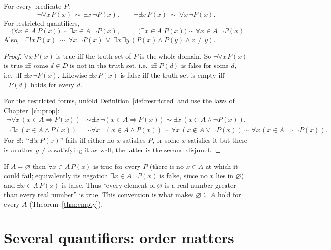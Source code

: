 \begin{theorem}\label{thm:qneg}
	For every predicate $P$:
	\[
	\neg\forall x\,P(x)\ \sim\ \exists x\,\neg P(x),\qquad \neg\exists x\,P(x)\ \sim\ \forall x\,\neg P(x).
	\]
	For restricted quantifiers,
	\[
	\neg\bigl(\forall x\in A\;P(x)\bigr)\sim\exists x\in A\;\neg P(x),\qquad
	\neg\bigl(\exists x\in A\;P(x)\bigr)\sim\forall x\in A\;\neg P(x).
	\]
	Also, $\neg\exists!x\,P(x)\ \sim\ \forall x\,\neg P(x)\ \vee\ \exists x\,\exists y\,(P(x)\wedge P(y)\wedge x\neq y)$.
\end{theorem}
\begin{proof}
	$\forall x\,P(x)$ is true iff the truth set of $P$ is the whole domain. So $\neg\forall x\,P(x)$ is true iff some $d\in D$ is not in the truth set, i.e.\ iff $P(d)$ is false for some $d$, i.e.\ iff $\exists x\,\neg P(x)$. Likewise $\exists x\,P(x)$ is false iff the truth set is empty iff $\neg P(d)$ holds for every $d$.
	
	For the restricted forms, unfold Definition~\ref{def:restricted} and use the laws of Chapter~\ref{ch:prop}:
	\begin{align*}
		\neg\forall x\,(x\in A\Rightarrow P(x))&\sim\exists x\,\neg(x\in A\Rightarrow P(x))\sim\exists x\,(x\in A\wedge\neg P(x)),\\
		\neg\exists x\,(x\in A\wedge P(x))&\sim\forall x\,\neg(x\in A\wedge P(x))\sim\forall x\,(x\notin A\vee\neg P(x))\sim\forall x\,(x\in A\Rightarrow\neg P(x)).
	\end{align*}
	For $\exists!$: ``$\exists!x\,P(x)$'' fails iff either no $x$ satisfies $P$, or some $x$ satisfies it but there is another $y\ne x$ satisfying it as well; the latter is the second disjunct.
\end{proof}

\begin{remark}
	If $A=\varnothing$ then $\forall x\in A\,P(x)$ is true for every $P$ (there is no $x\in A$ at which it could fail; equivalently its negation $\exists x\in A\,\neg P(x)$ is false, since no $x$ lies in $\varnothing$) and $\exists x\in A\,P(x)$ is false. Thus ``every element of $\varnothing$ is a real number greater than every real number'' is true. This convention is what makes $\varnothing\subseteq A$ hold for every $A$ (Theorem~\ref{thm:empty}).
\end{remark}

\section{Several quantifiers: order matters}

